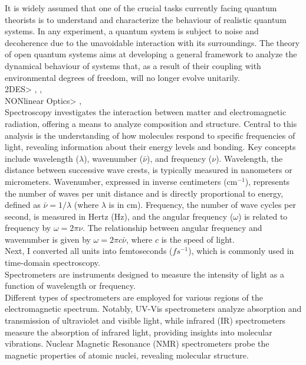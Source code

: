 It is widely assumed that one of the crucial tasks currently facing quantum theorists
is to understand and characterize the behaviour of realistic quantum systems. In
any experiment, a quantum system is subject to noise and decoherence due to the
unavoidable interaction with its surroundings. The theory of open quantum systems
aims at developing a general framework to analyze the dynamical behaviour of systems
that, as a result of their coupling with environmental degrees of freedom, will no
longer evolve unitarily. \cite{rivasMarkovianMasterEquations2010}
\\
2DES> \cite{krumlandTwodimensionalElectronicSpectroscopy2023}, \cite{segarra-martiAccurateSimulationTwoDimensional2018}, \cite{sunTwodimensionalSpectroscopyOpen2024}
\\
NONlinear Optics> \cite{hammPrinciplesNonlinearOptical}, \cite{mukamelPrinciplesNonlinearOptical1995}
\\
Spectroscopy investigates the interaction between matter and electromagnetic radiation, offering a means to analyze composition and structure.
Central to this analysis is the understanding of how molecules respond to specific frequencies of light, revealing information about their energy levels and bonding.
Key concepts include wavelength ($\lambda$), wavenumber ($\bar{\nu}$), and frequency ($\nu$).
Wavelength, the distance between successive wave crests, is typically measured in nanometers or micrometers.
Wavenumber, expressed in inverse centimeters (cm$^{-1}$), represents the number of waves per unit distance and is directly proportional to energy, defined as $\bar{\nu} = 1/\lambda$ (where $\lambda$ is in cm).
Frequency, the number of wave cycles per second, is measured in Hertz (Hz), and the angular frequency ($\omega$) is related to frequency by $\omega = 2\pi\nu$.
The relationship between angular frequency and wavenumber is given by $\omega = 2\pi c \bar{\nu}$, where $c$ is the speed of light.\\
Next, I converted all units into femtoseconds ($fs^{-1}$), which is commonly used in time-domain spectroscopy.\\
Spectrometers are instruments designed to measure the intensity of light as a function of wavelength or frequency.\\
Different types of spectrometers are employed for various regions of the electromagnetic spectrum.
Notably, UV-Vis spectrometers analyze absorption and transmission of ultraviolet and visible light, while infrared (IR) spectrometers measure the absorption of infrared light, providing insights into molecular vibrations.
Nuclear Magnetic Resonance (NMR) spectrometers probe the magnetic properties of atomic nuclei, revealing molecular structure.




